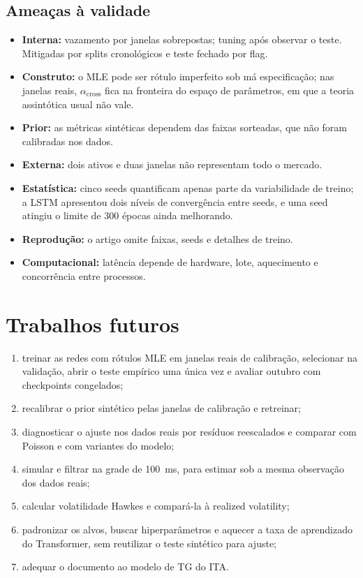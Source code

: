 \documentclass[12pt,a4paper,openany]{report}
\begin{document}
\section{Ameaças à validade}

\begin{itemize}
  \item \textbf{Interna:} vazamento por janelas sobrepostas; tuning após observar o
        teste. Mitigadas por splits cronológicos e teste fechado por flag.
  \item \textbf{Construto:} o MLE pode ser rótulo imperfeito sob má especificação; nas
        janelas reais, $\alpha_{\mathrm{cross}}$ fica na fronteira do espaço de
        parâmetros, em que a teoria assintótica usual não vale.
  \item \textbf{Prior:} as métricas sintéticas dependem das faixas sorteadas, que não
        foram calibradas nos dados.
  \item \textbf{Externa:} dois ativos e duas janelas não representam todo o mercado.
  \item \textbf{Estatística:} cinco seeds quantificam apenas parte da variabilidade de
        treino; a LSTM apresentou dois níveis de convergência entre seeds, e uma seed
        atingiu o limite de 300 épocas ainda melhorando.
  \item \textbf{Reprodução:} o artigo omite faixas, seeds e detalhes de treino.
  \item \textbf{Computacional:} latência depende de hardware, lote, aquecimento e
        concorrência entre processos.
\end{itemize}

\chapter{Trabalhos futuros}
\label{cap:futuro}

\begin{enumerate}
  \item treinar as redes com rótulos MLE em janelas reais de calibração, selecionar na
        validação, abrir o teste empírico uma única vez e avaliar outubro com
        checkpoints congelados;
  \item recalibrar o prior sintético pelas janelas de calibração e retreinar;
  \item diagnosticar o ajuste nos dados reais por resíduos reescalados
        \citep{ogata1988,brown2002} e comparar com Poisson e com variantes do modelo;
  \item simular e filtrar na grade de 100~ms, para estimar sob a mesma observação dos
        dados reais;
  \item calcular volatilidade Hawkes e compará-la à realized volatility;
  \item padronizar os alvos, buscar hiperparâmetros e aquecer a taxa de aprendizado
        do Transformer, sem reutilizar o teste sintético para ajuste;
  \item adequar o documento ao modelo de TG do ITA.
\end{enumerate}
\end{document}
